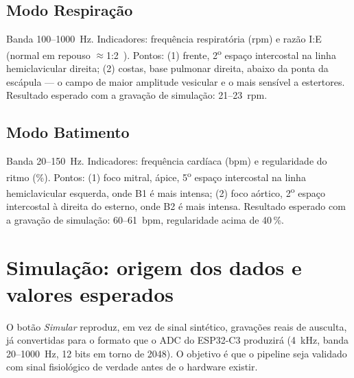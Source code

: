 \documentclass[conference,a4paper]{IEEEtran}
\begin{document}
\subsection{Modo Respiração}
Banda 100--1000~Hz. Indicadores: frequência respiratória (rpm) e razão I:E (normal em repouso $\approx$1:2~\cite{bohadana2014}). Pontos: (1) frente, 2\textsuperscript{o} espaço intercostal na linha hemiclavicular direita; (2) costas, base pulmonar direita, abaixo da ponta da escápula --- o campo de maior amplitude vesicular e o mais sensível a estertores. Resultado esperado com a gravação de simulação: 21--23~rpm.

\subsection{Modo Batimento}
Banda 20--150~Hz. Indicadores: frequência cardíaca (bpm) e regularidade do ritmo (\%). Pontos: (1) foco mitral, ápice, 5\textsuperscript{o} espaço intercostal na linha hemiclavicular esquerda, onde B1 é mais intensa; (2) foco aórtico, 2\textsuperscript{o} espaço intercostal à direita do esterno, onde B2 é mais intensa. Resultado esperado com a gravação de simulação: 60--61~bpm, regularidade acima de 40\,\%.

\section{Simulação: origem dos dados e valores esperados}
\label{sec:sim}
O botão \emph{Simular} reproduz, em vez de sinal sintético, gravações reais de ausculta, já convertidas para o formato que o ADC do ESP32-C3 produzirá (4~kHz, banda 20--1000~Hz, 12 bits em torno de 2048). O objetivo é que o pipeline seja validado com sinal fisiológico de verdade antes de o hardware existir.
\end{document}
